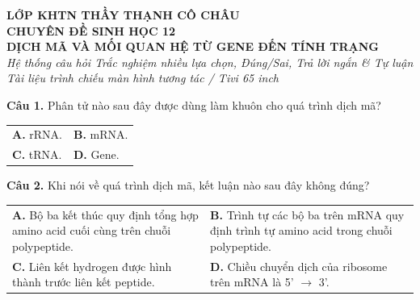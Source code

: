 \documentclass{article}
\begin{document}
\noindent\begin{minipage}[t][14.4cm][c]{\linewidth}
\begin{center}
{\fontsize{34}{44}\selectfont \textbf{\color{brandRed}LỚP KHTN THẦY THẠNH CÔ CHÂU}}\\[16pt]
{\fontsize{24}{32}\selectfont \textbf{CHUYÊN ĐỀ SINH HỌC 12}}\\[22pt]
{\fontsize{38}{48}\selectfont \textbf{\color{brandGreen}DỊCH MÃ VÀ MỐI QUAN HỆ TỪ GENE ĐẾN TÍNH TRẠNG}}\\[26pt]
{\fontsize{22}{30}\selectfont \textit{Hệ thống câu hỏi Trắc nghiệm nhiều lựa chọn, Đúng/Sai, Trả lời ngắn \& Tự luận}}\\[14pt]
{\fontsize{20}{28}\selectfont \textit{Tài liệu trình chiếu màn hình tương tác / Tivi 65 inch}}
\end{center}
\end{minipage}
\newpage


\begin{minipage}[t][14.4cm][t]{\linewidth}
\fontsize{22}{29}\selectfont

\textbf{Câu 1.} Phân tử nào sau đây được dùng làm khuôn cho quá trình dịch mã?\\[4pt]
\begin{tabularx}{\linewidth}{@{}X X@{}}
\textbf{A. } rRNA. & \textbf{B. } mRNA.\\[4pt]
\textbf{C. } tRNA. & \textbf{D. } Gene.
\end{tabularx}
\vspace*{\fill}
\textbf{Câu 2.} Khi nói về quá trình dịch mã, kết luận nào sau đây không đúng?\\[4pt]
\begin{tabularx}{\linewidth}{@{}X X@{}}
\textbf{A. } Bộ ba kết thúc quy định tổng hợp amino acid cuối cùng trên chuỗi polypeptide. & \textbf{B. } Trình tự các bộ ba trên mRNA quy định trình tự amino acid trong chuỗi polypeptide.\\[4pt]
\textbf{C. } Liên kết hydrogen được hình thành trước liên kết peptide. & \textbf{D. } Chiều chuyển dịch của ribosome trên mRNA là 5' $\rightarrow$ 3'.
\end{tabularx}

\end{minipage}
\newpage
\end{document}
